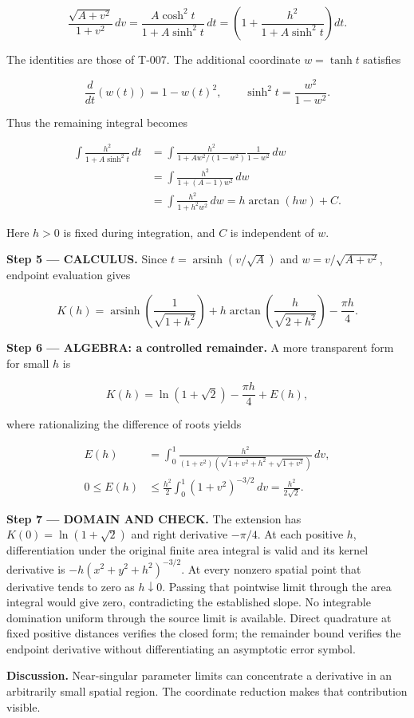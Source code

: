 \documentclass[11pt,oneside,openany]{book}
\begin{document}
\[
\frac{\sqrt{A+v^2}}{1+v^2}\,dv
=\frac{A\cosh^2t}{1+A\sinh^2t}\,dt
=\left(1+\frac{h^2}{1+A\sinh^2t}\right)dt.
\]

The identities are those of T-007. The additional coordinate \(w=\tanh t\) satisfies

\[
\frac{d}{dt}(w(t))=1-w(t)^2,
\qquad
\sinh^2t=\frac{w^2}{1-w^2}.
\]

Thus the remaining integral becomes

\[
\begin{aligned}
\int\frac{h^2}{1+A\sinh^2t}\,dt
&=\int\frac{h^2}{1+A w^2/(1-w^2)}\frac{1}{1-w^2}\,dw\\
&=\int\frac{h^2}{1+(A-1)w^2}\,dw\\
&=\int\frac{h^2}{1+h^2w^2}\,dw
=h\arctan(hw)+C.
\end{aligned}
\]

Here \(h>0\) is fixed during integration, and \(C\) is independent of \(w\).

\endgroup
\textbf{Step 5 --- CALCULUS.} Since \(t=\operatorname{arsinh}(v/\sqrt A)\) and \(w=v/\sqrt{A+v^2}\), endpoint evaluation gives

\[
K(h)=\operatorname{arsinh}\left(\frac1{\sqrt{1+h^2}}\right)
+h\arctan\left(\frac{h}{\sqrt{2+h^2}}\right)-\frac{\pi h}{4}.
\]

\begingroup\color{AlgebraBlue}
\textbf{Step 6 --- ALGEBRA: a controlled remainder.} A more transparent form for small \(h\) is

\[
K(h)=\ln(1+\sqrt2)-\frac{\pi h}{4}+E(h),
\]

where rationalizing the difference of roots yields

\[
\begin{aligned}
E(h)&=\int_0^1\frac{h^2}{(1+v^2)(\sqrt{1+v^2+h^2}+\sqrt{1+v^2})}\,dv,\\
0\le E(h)&\le\frac{h^2}{2}\int_0^1(1+v^2)^{-3/2}\,dv
=\frac{h^2}{2\sqrt2}.
\end{aligned}
\]

\endgroup
\begin{DomainStep}
\textbf{Step 7 --- DOMAIN AND CHECK.} The extension has \(K(0)=\ln(1+\sqrt2)\) and right derivative \(-\pi/4\). At each positive \(h\), differentiation under the original finite area integral is valid and its kernel derivative is \(-h(x^2+y^2+h^2)^{-3/2}\). At every nonzero spatial point that derivative tends to zero as \(h\downarrow0\). Passing that pointwise limit through the area integral would give zero, contradicting the established slope. No integrable domination uniform through the source limit is available. Direct quadrature at fixed positive distances verifies the closed form; the remainder bound verifies the endpoint derivative without differentiating an asymptotic error symbol.

\end{DomainStep}
\textbf{Discussion.} Near-singular parameter limits can concentrate a derivative in an arbitrarily small spatial region. The coordinate reduction makes that contribution visible.
\clearpage
\end{document}
